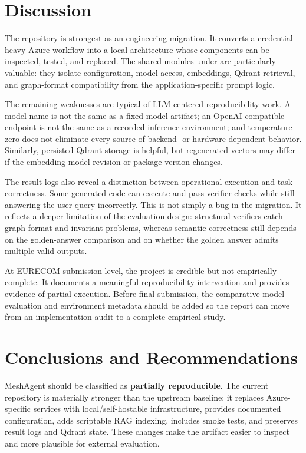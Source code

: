 \documentclass[11pt,a4paper]{article}
\newcommand{\repo}{MeshAgent}
\begin{document}
\section{Discussion}

The repository is strongest as an engineering migration. It converts a credential-heavy Azure workflow into a local architecture whose components can be inspected, tested, and replaced. The shared modules under  are particularly valuable: they isolate configuration, model access, embeddings, Qdrant retrieval, and graph-format compatibility from the application-specific prompt logic.

The remaining weaknesses are typical of LLM-centered reproducibility work. A model name is not the same as a fixed model artifact; an OpenAI-compatible endpoint is not the same as a recorded inference environment; and temperature zero does not eliminate every source of backend- or hardware-dependent behavior. Similarly, persisted Qdrant storage is helpful, but regenerated vectors may differ if the embedding model revision or package version changes.

The result logs also reveal a distinction between operational execution and task correctness. Some generated code can execute and pass verifier checks while still answering the user query incorrectly. This is not simply a bug in the migration. It reflects a deeper limitation of the evaluation design: structural verifiers catch graph-format and invariant problems, whereas semantic correctness still depends on the golden-answer comparison and on whether the golden answer admits multiple valid outputs.

At EURECOM submission level, the project is credible but not empirically complete. It documents a meaningful reproducibility intervention and provides evidence of partial execution. Before final submission, the comparative model evaluation and environment metadata should be added so the report can move from an implementation audit to a complete empirical study.

\section{Conclusions and Recommendations}

\repo{} should be classified as \textbf{partially reproducible}. The current repository is materially stronger than the upstream baseline: it replaces Azure-specific services with local/self-hostable infrastructure, provides documented configuration, adds scriptable RAG indexing, includes smoke tests, and preserves result logs and Qdrant state. These changes make the artifact easier to inspect and more plausible for external evaluation.
\end{document}
